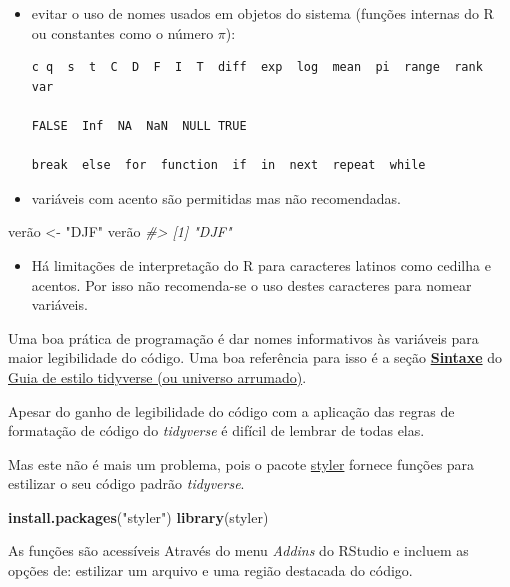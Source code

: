 \documentclass[]{book}
\newenvironment{Shaded}{\begin{snugshade}}{\end{snugshade}}
\newcommand{\KeywordTok}[1]{\textcolor[rgb]{0.13,0.29,0.53}{\textbf{#1}}}
\newcommand{\StringTok}[1]{\textcolor[rgb]{0.31,0.60,0.02}{#1}}
\newcommand{\CommentTok}[1]{\textcolor[rgb]{0.56,0.35,0.01}{\textit{#1}}}
\newcommand{\NormalTok}[1]{#1}
\newenvironment{rmdblock}[1]
  {\begin{shaded*}
  \begin{itemize}
  \renewcommand{\labelitemi}{
    \raisebox{-.7\height}[0pt][0pt]{
      {\setkeys{Gin}{width=3em,keepaspectratio}\texttt{[image: images/\#1]}}
    }
  }
  \item
  }
  {
  \end{itemize}
  \end{shaded*}
  }
\newenvironment{rmdtip}
  {\begin{rmdblock}{tip}}
  {\end{rmdblock}}
\begin{document}
\begin{itemize}
\item
  evitar o uso de nomes usados em objetos do sistema (funções internas
  do R ou constantes como o número \(\pi\)):

\begin{verbatim}
c q  s  t  C  D  F  I  T  diff  exp  log  mean  pi  range  rank  var

FALSE  Inf  NA  NaN  NULL TRUE 

break  else  for  function  if  in  next  repeat  while
\end{verbatim}
\item
  variáveis com acento são permitidas mas não recomendadas.
\end{itemize}

\begin{Shaded}
\begin{Highlighting}[]
\NormalTok{verão <-}\StringTok{ "DJF"}
\NormalTok{verão}
\CommentTok{#> [1] "DJF"}
\end{Highlighting}
\end{Shaded}

\begin{rmdtip}
Há limitações de interpretação do R para caracteres latinos como cedilha
e acentos. Por isso não recomenda-se o uso destes caracteres para nomear
variáveis.
\end{rmdtip}

Uma boa prática de programação é dar nomes informativos às variáveis
para maior legibilidade do código. Uma boa referência para isso é a
seção \href{http://style.tidyverse.org/syntax.html}{\textbf{Sintaxe}} do
\href{http://style.tidyverse.org/}{Guia de estilo tidyverse (ou universo
arrumado)}.

Apesar do ganho de legibilidade do código com a aplicação das regras de
formatação de código do \emph{tidyverse} é difícil de lembrar de todas
elas.

Mas este não é mais um problema, pois o pacote
\href{http://styler.r-lib.org/}{styler} fornece funções para estilizar o
seu código padrão \emph{tidyverse}.

\begin{Shaded}
\begin{Highlighting}[]
\KeywordTok{install.packages}\NormalTok{(}\StringTok{"styler"}\NormalTok{)}
\KeywordTok{library}\NormalTok{(styler)}
\end{Highlighting}
\end{Shaded}

As funções são acessíveis Através do menu \emph{Addins} do RStudio e
incluem as opções de: estilizar um arquivo e uma região destacada do
código.
\end{document}
